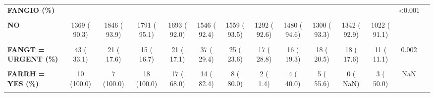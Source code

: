 \documentclass[
]{article}
\begin{document}
\begin{table}[H]
\begin{tabular}[t]{>{\raggedright\arraybackslash}p{5em}ccccccccccccc}
\textbf{FANGIO (\%)} &  &  &  &  &  &  &  &  &  &  &  & <0.001 & \\
\textbf{\cellcolor{gray!10}{9}} & \cellcolor{gray!10}{0 (  0.0)} & \cellcolor{gray!10}{0 (  0.0)} & \cellcolor{gray!10}{0 (  0.0)} & \cellcolor{gray!10}{0 (  0.0)} & \cellcolor{gray!10}{0 (  0.0)} & \cellcolor{gray!10}{0 (  0.0)} & \cellcolor{gray!10}{45 (  3.2)} & \cellcolor{gray!10}{0 (  0.0)} & \cellcolor{gray!10}{0 (  0.0)} & \cellcolor{gray!10}{0 (  0.0)} & \cellcolor{gray!10}{0 (  0.0)} & \cellcolor{gray!10}{} & \cellcolor{gray!10}{}\\
\textbf{NO} & 1369 ( 90.3) & 1846 ( 93.9) & 1791 ( 95.1) & 1693 ( 92.0) & 1546 ( 92.4) & 1559 ( 93.5) & 1292 ( 92.6) & 1480 ( 94.6) & 1300 ( 93.3) & 1342 ( 92.9) & 1022 ( 91.1) &  & \\
\textbf{\cellcolor{gray!10}{YES}} & \cellcolor{gray!10}{147 (  9.7)} & \cellcolor{gray!10}{119 (  6.1)} & \cellcolor{gray!10}{93 (  4.9)} & \cellcolor{gray!10}{147 (  8.0)} & \cellcolor{gray!10}{127 (  7.6)} & \cellcolor{gray!10}{109 (  6.5)} & \cellcolor{gray!10}{59 (  4.2)} & \cellcolor{gray!10}{84 (  5.4)} & \cellcolor{gray!10}{94 (  6.7)} & \cellcolor{gray!10}{103 (  7.1)} & \cellcolor{gray!10}{100 (  8.9)} & \cellcolor{gray!10}{} & \cellcolor{gray!10}{}\\
\textbf{FANGT = URGENT (\%)} & 43 ( 33.1) & 21 ( 17.6) & 15 ( 16.7) & 21 ( 17.1) & 37 ( 29.4) & 25 ( 23.6) & 17 ( 28.8) & 16 ( 19.3) & 18 ( 20.5) & 18 ( 17.6) & 11 ( 11.1) & 0.002 & \\
\textbf{\cellcolor{gray!10}{FARR = YES (\%)}} & \cellcolor{gray!10}{10 (  0.7)} & \cellcolor{gray!10}{7 (  0.4)} & \cellcolor{gray!10}{18 (  1.0)} & \cellcolor{gray!10}{29 (  1.6)} & \cellcolor{gray!10}{17 (  1.0)} & \cellcolor{gray!10}{11 (  0.7)} & \cellcolor{gray!10}{6 (  0.4)} & \cellcolor{gray!10}{9 (  0.6)} & \cellcolor{gray!10}{9 (  0.6)} & \cellcolor{gray!10}{5 (  0.3)} & \cellcolor{gray!10}{6 (  0.5)} & \cellcolor{gray!10}{0.001} & \cellcolor{gray!10}{}\\
\textbf{FARRH = YES (\%)} & 10 (100.0) & 7 (100.0) & 18 (100.0) & 17 ( 68.0) & 14 ( 82.4) & 8 ( 80.0) & 2 (  1.4) & 4 ( 40.0) & 5 ( 55.6) & 0 (  NaN) & 3 ( 50.0) & NaN & \\
\textbf{\cellcolor{gray!10}{FCABG = YES (\%)}} & \cellcolor{gray!10}{54 (  3.6)} & \cellcolor{gray!10}{69 (  3.5)} & \cellcolor{gray!10}{70 (  3.7)} & \cellcolor{gray!10}{123 (  6.6)} & \cellcolor{gray!10}{131 (  7.8)} & \cellcolor{gray!10}{122 (  7.3)} & \cellcolor{gray!10}{81 (  6.0)} & \cellcolor{gray!10}{102 (  6.5)} & \cellcolor{gray!10}{50 (  3.6)} & \cellcolor{gray!10}{78 (  5.4)} & \cellcolor{gray!10}{39 (  3.5)} & \cellcolor{gray!10}{<0.001} & \cellcolor{gray!10}{}\\

\end{tabular}
\end{table}
\end{document}
